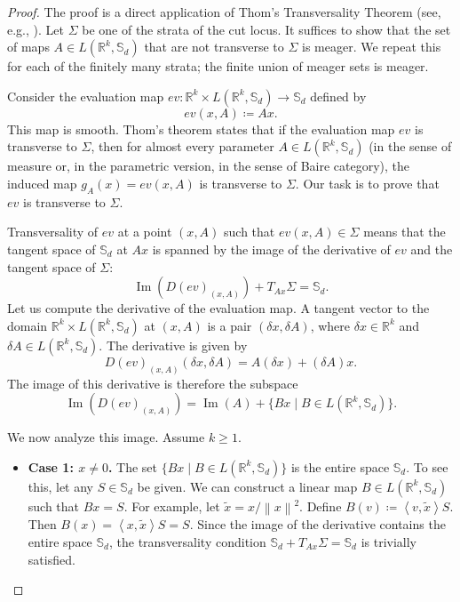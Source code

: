 \documentclass[12pt, letterpaper]{amsart}
\DeclareMathOperator{\Image}{Im}
\newcommand{\Sd}{\mathbb{S}_d}
\newcommand{\R}{\mathbb{R}}
\newcommand{\norm}[1]{\left\lVert#1\right\rVert}
\newcommand{\scpr}[2]{\left\langle #1, #2 \right\rangle}
\theoremstyle{plain}
\theoremstyle{definition}
\theoremstyle{remark}
\numberwithin{equation}{section} %
\begin{document}
\begin{proof}
The proof is a direct application of Thom's Transversality Theorem (see, e.g., \cite[Chapter 3, \S 2]{GuilleminPollack1974}). Let \(\Sigma\) be one of the strata of the cut locus. It suffices to show that the set of maps \(A \in L(\R^k, \Sd)\) that are not transverse to \(\Sigma\) is meager. We repeat this for each of the finitely many strata; the finite union of meager sets is meager.

Consider the evaluation map \(ev: \R^k \times L(\R^k, \Sd) \to \Sd\) defined by
\[ ev(x, A) \coloneqq Ax. \]
This map is smooth. Thom's theorem states that if the evaluation map \(ev\) is transverse to \(\Sigma\), then for almost every parameter \(A \in L(\R^k, \Sd)\) (in the sense of measure or, in the parametric version, in the sense of Baire category), the induced map \(g_A(x) = ev(x,A)\) is transverse to \(\Sigma\). Our task is to prove that \(ev\) is transverse to \(\Sigma\).

Transversality of \(ev\) at a point \((x, A)\) such that \(ev(x,A) \in \Sigma\) means that the tangent space of \(\Sd\) at \(Ax\) is spanned by the image of the derivative of \(ev\) and the tangent space of \(\Sigma\):
\[ \Image(D(ev)_{(x,A)}) + T_{Ax}\Sigma = \Sd. \]
Let us compute the derivative of the evaluation map. A tangent vector to the domain \(\R^k \times L(\R^k, \Sd)\) at \((x,A)\) is a pair \((\delta x, \delta A)\), where \(\delta x \in \R^k\) and \(\delta A \in L(\R^k, \Sd)\). The derivative is given by
\[ D(ev)_{(x,A)}(\delta x, \delta A) = A(\delta x) + (\delta A)x. \]
The image of this derivative is therefore the subspace
\[ \Image(D(ev)_{(x,A)}) = \Image(A) + \{ Bx \mid B \in L(\R^k, \Sd) \}. \]

We now analyze this image. Assume \(k \ge 1\).
\begin{itemize}
    \item \textbf{Case 1: \(x \neq 0\).} The set \(\{ Bx \mid B \in L(\R^k, \Sd) \}\) is the entire space \(\Sd\). To see this, let any \(S \in \Sd\) be given. We can construct a linear map \(B \in L(\R^k, \Sd)\) such that \(Bx=S\). For example, let \(\tilde{x} = x/\norm{x}^2\). Define \(B(v) \coloneqq \scpr{v}{\tilde{x}} S\). Then \(B(x) = \scpr{x}{\tilde{x}} S = S\). Since the image of the derivative contains the entire space \(\Sd\), the transversality condition \(\Sd + T_{Ax}\Sigma = \Sd\) is trivially satisfied.


\end{itemize}
\end{proof}
\end{document}
